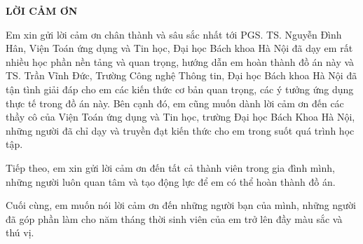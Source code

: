 \documentclass[../main.tex]{subfiles}
\begin{document}
\begin{center}
    \Large{\textbf{LỜI CẢM ƠN}}\\
\end{center}
\vspace{1cm}
Em xin gửi lời cảm ơn chân thành và sâu sắc nhất tới PGS. TS. Nguyễn Đình Hân, Viện Toán ứng dụng và Tin học, Đại học Bách khoa Hà Nội đã dạy em rất nhiều học phần nền tảng và quan trọng, hướng dẫn em hoàn thành đồ án này và TS. Trần Vĩnh Đức, Trường Công nghệ Thông tin, Đại học Bách khoa Hà Nội  đã tận tình giải đáp cho em các kiến thức cơ bản quan trọng, các ý tưởng ứng dụng thực tế trong đồ án này. Bên cạnh đó, em cũng muốn dành lời cảm ơn đến các thầy cô của Viện Toán ứng dụng và Tin học, trường Đại học Bách Khoa
Hà Nội, những người đã chỉ dạy và truyền đạt kiến thức cho em trong suốt
quá trình học tập.

Tiếp theo, em xin gửi lời cảm ơn đến tất cả thành viên trong gia đình
mình, những người luôn quan tâm và tạo động lực để em có thể hoàn thành
đồ án.

Cuối cùng, em muốn nói lời cảm ơn đến những người bạn của mình, những
người đã góp phần làm cho năm tháng thời sinh viên của em trở lên
đầy màu sắc và thú vị.
\end{document}
